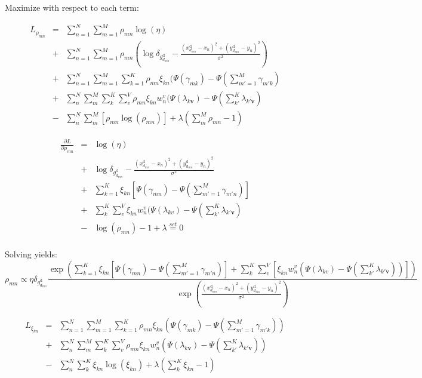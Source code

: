 \documentclass[]{article}
\newcommand{\mbrack}[1]{\left\lbrack #1 \right\rbrack}
\newcommand{\mparen}[1]{\left(#1\right)}
\begin{document}
Maximize with respect to each term:

\begin{eqnarray}
L_{\rho_{mn}} 
&=&\sum\limits_{n=1}^{N} \sum\limits_{m=1}^{M} \rho_{mn} \log(\eta) \\
&+& \sum\limits_{n=1}^{N} \sum\limits_{m=1}^{M} \rho_{mn} (\log \delta_{g_{d_{mn}}^{\mathrm{d}}} - \frac{(x_{d_{mn}}^{\mathrm{d}} - x_n)^2 + (y_{d_{mn}}^{\mathrm{d}} - y_n)^2}{\sigma^2})\\
&+& \sum\limits_{n=1}^{N} \sum\limits_{m=1}^{M} \sum\limits_{k=1}^{K} \rho_{mn} \xi_{kn} (\Psi(\gamma_{mk}) - \Psi(\sum\limits_{m'=1}^{M} \gamma_{m'k}) \\
&+& \sum\limits_{n}^{N} \sum\limits_{m}^{M} \sum\limits_{k}^{K} \sum\limits_{v}^{V} \rho_{mn} \xi_{kn} w_n^v (\Psi(\lambda_{k\boldsymbol{v}}) - \Psi(\sum\limits_{k'}^{K} \lambda_{k'\boldsymbol{v}}) \\
&-& \sum\limits_{n}^{N} \sum\limits_{m}^{M} \mbrack{\rho_{mn} \log(\rho_{mn})}
+ \lambda \mparen{\sum\limits_{m}^{M}\rho_{mn} - 1 }
\end{eqnarray}

\begin{eqnarray}
\frac{\partial L}{\partial \rho_{mn}}
&=& \log(\eta) \\
&+& \log \delta_{g_{d_{mn}}^{\mathrm{d}}} - \frac{(x_{d_{mn}}^{\mathrm{d}} - x_n)^2 + (y_{d_{mn}}^{\mathrm{d}} - y_n)^2}{\sigma^2} \\
&+& \sum\limits_{k=1}^{K} \xi_{kn} \left[ \Psi(\gamma_{mn}) - \Psi(\sum\limits_{m'=1}^{M} \gamma_{m'n}) \right] \\
&+& \sum\limits_{k}^{K} \sum\limits_{v}^{V} \xi_{kn} w_n^v (\Psi(\lambda_{kv}) - \Psi(\sum\limits_{k'}^{K} \lambda_{k' \boldsymbol{v}}) \\
&-& \log(\rho_{mn}) - 1 + \lambda \stackrel{set}{=} 0 \\
\end{eqnarray}

Solving yields:
\[ \boxed{
\rho_{mn} \propto \eta \delta_{g_{d_{mn}}^{\mathrm{d}}} \frac{\exp \mparen{\sum\limits_{k=1}^{K} \xi_{kn}\mbrack{\Psi(\gamma_{mn}) - \Psi\mparen{\sum\limits_{m'=1}^{M} \gamma_{m'n}}} + \sum\limits_{k}^{K} \sum\limits_{v}^{V} \mbrack{\xi_{kn} w_n^v \mparen{\Psi(\lambda_{kv}) - \Psi\mparen{\sum\limits_{k'}^{K} \lambda_{k' \boldsymbol{v}}}}} }}
{\exp\mparen{\frac{(x_{d_{mn}}^{\mathrm{d}} - x_n)^2 + (y_{d_{mn}}^{\mathrm{d}} - y_n)^2}{\sigma^2}}}
} \]

\begin{eqnarray}
L_{\xi_{kn}}
&=& \sum\limits_{n=1}^{N} \sum\limits_{m=1}^{M} \sum\limits_{k=1}^{K} \rho_{mn} \xi_{kn} (\Psi(\gamma_{mk}) - \Psi(\sum\limits_{m'=1}^{M} \gamma_{m'k})) \\
&+& \sum\limits_{n}^{N} \sum\limits_{m}^{M} \sum\limits_{k}^{K} \sum\limits_{v}^{V} \rho_{mn} \xi_{kn} w_n^v (\Psi(\lambda_{k\boldsymbol{v}}) - \Psi(\sum\limits_{k'}^{K} \lambda_{k'\boldsymbol{v}})) \\
&-& \sum\limits_{n}^{N} \sum\limits_{k}^{K} \xi_{kn} \log(\xi_{kn}) + \lambda(\sum\limits_{k}^{K} \xi_{kn} - 1)\\
\end{eqnarray}
\end{document}
